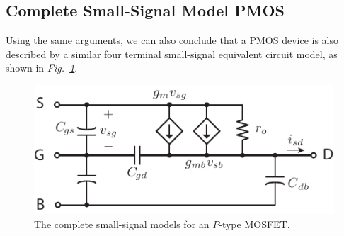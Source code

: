 \subsection{Complete Small-Signal Model PMOS}
Using the same arguments, we can also conclude that a PMOS device is also described by a similar four terminal small-signal equivalent circuit model, as shown in \emph{Fig.~\ref{fig:pmos4term_ac}}.
\begin{figure}[h]
\centering
\includegraphics[scale=1]{pmos4term_ac}
\caption{The complete small-signal models for an $P$-type MOSFET.}
\label{fig:pmos4term_ac}
\end{figure}
